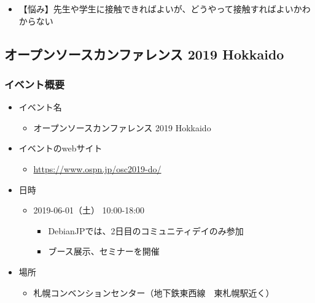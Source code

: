 \documentclass[mingoth,a4paper]{jsarticle}
\begin{document}

\begin{itemize}
\item 【悩み】先生や学生に接触できればよいが、どうやって接触すればよいかわからない
\end{itemize}


\subsection{オープンソースカンファレンス 2019 Hokkaido}

\subsubsection{イベント概要}

\begin{itemize}
\item イベント名
  \begin{itemize}
  \item オープンソースカンファレンス 2019 Hokkaido
  \end{itemize}
\end{itemize}

\begin{itemize}
\item イベントのwebサイト
  \begin{itemize}
  \item \url{https://www.ospn.jp/osc2019-do/}
  \end{itemize}
\end{itemize}

\begin{itemize}
\item 日時
  \begin{itemize}
  \item 2019-06-01（土） 10:00-18:00
    \begin{itemize}
    \item DebianJPでは、2日目のコミュニティデイのみ参加
    \item ブース展示、セミナーを開催
    \end{itemize}
  \end{itemize}
\end{itemize}

\begin{itemize}
\item 場所
  \begin{itemize}
  \item 札幌コンベンションセンター（地下鉄東西線　東札幌駅近く）
  \end{itemize}
\end{itemize}
\end{document}
